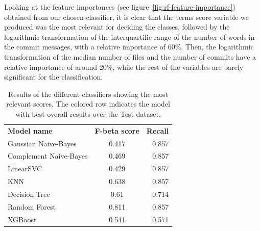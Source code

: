 \documentclass[a4paper, 12pt]{book}
\begin{document}
Looking at the feature importances (see figure~\ref{fig:rf-feature-importance}) obtained from our chosen classifier, it is clear that the terms score variable we produced was the most relevant for deciding the classes, followed by the logarithmic transformation of the interquartilic range of the number of words in the commit messages, with a relative importance of 60\%. Then, the logarithmic transformation of the median number of files and the number of commits have a relative importance of around 20\%, while the rest of the variables are barely significant for the classification.

\begin{table}[tb]
\renewcommand{\arraystretch}{1.5}
\begin{center}
\begin{tabular}{ l c r }
  \toprule
  \textbf{Model name}    & \textbf{F-beta score} & \textbf{Recall} \\
      Gaussian Naive-Bayes   & 0.417                 & 0.857           \\ 
      Complement Naive-Bayes & 0.469                 & 0.857           \\ 
      LinearSVC              & 0.429                 & 0.857           \\ 
      KNN                    & 0.638                 & 0.857           \\ 
      Decision Tree          & 0.61                  & 0.714           \\ 
      \rowcolor[HTML]{67FD9A} 
      Random Forest          & 0.811                 & 0.857           \\ 
      XGBoost                & 0.541                 & 0.571           \\
  \bottomrule
\end{tabular}
\caption{Results of the different classifiers showing the most relevant scores. The colored row indicates the model with best overall results over the Test dataset.}
\label{table:model-results}
\end{center}
\end{table}
\end{document}
